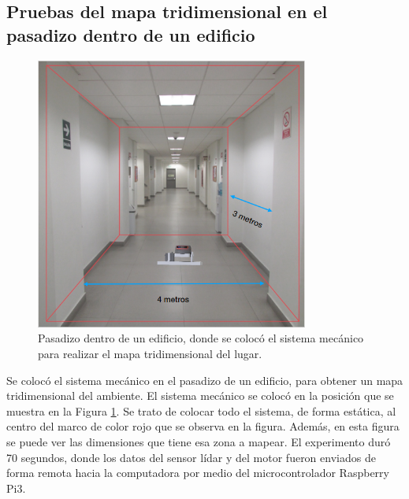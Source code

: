 \subsection{Pruebas del mapa tridimensional en el pasadizo dentro de un edificio}
\begin{figure}
  \centering \footnotesize
  \includegraphics[width=0.80\textwidth]{images/esan_lidar.PNG}
  \captionsetup{font=footnotesize}
  \caption{Pasadizo dentro de un edificio, donde se colocó el sistema mecánico para 
  realizar el mapa tridimensional del lugar.}
  \label{fig:pasadizoEsan}
\end{figure}

Se colocó el sistema mecánico en el pasadizo de un edificio, para obtener un mapa
tridimensional del ambiente. El sistema mecánico se colocó en la posición que se
muestra en la Figura \ref{fig:pasadizoEsan}. Se trato de colocar todo el sistema, de
forma estática, al centro del marco de color rojo que se observa en la figura. Además, 
en esta figura se puede ver las dimensiones que tiene esa zona a mapear. El experimento
duró 70 segundos, donde los datos del sensor lídar y del motor fueron enviados de forma
remota hacia la computadora por medio del microcontrolador Raspberry Pi3.



